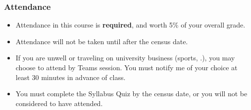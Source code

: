 \begin{frame}
  \frametitle{Attendance}

  \begin{itemize}
  \item Attendance in this course is \textbf{required}, and worth 5\% of your overall grade.
  \item Attendance will not be taken until after the census date.
  \item If you are unwell or traveling on university business (sports, \etc.), you may choose to attend by Teams session.
    You must notify me of your choice at least 30 minutes in advance of class.
  \item[\(\Rightarrow\)] You must complete the Syllabus Quiz by the census date, or you will not be considered to have attended.
  \end{itemize}
  
\end{frame}
